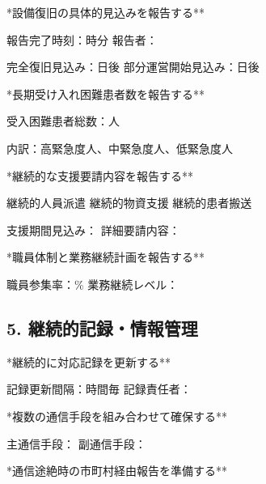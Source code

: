 \documentclass[
  japanese,
  letterpaper,
  DIV=11,
  numbers=noendperiod]{scrartcl}
\begin{document}
\checkbox **設備復旧の具体的見込みを報告する**

\quad 報告完了時刻：\underlinespace{1cm}時\underlinespace{1cm}分
\quad 報告者：\underlinespace{4cm}

\quad 完全復旧見込み：\underlinespace{2cm}日後
\quad 部分運営開始見込み：\underlinespace{2cm}日後

\vspace{3mm}

\checkbox **長期受け入れ困難患者数を報告する**

\quad 受入困難患者総数：\underlinespace{2cm}人

\quad 内訳：高緊急度\underlinespace{2cm}人、中緊急度\underlinespace{2cm}人、低緊急度\underlinespace{2cm}人

\vspace{3mm}

\checkbox **継続的な支援要請内容を報告する**

\checkbox 継続的人員派遣 \quad \checkbox 継続的物資支援
\quad \checkbox 継続的患者搬送

\quad 支援期間見込み：\underlinespace{4cm}
\quad 詳細要請内容：\underlinespace{8cm}

\vspace{3mm}

\checkbox **職員体制と業務継続計画を報告する**

\quad 職員参集率：\underlinespace{2cm}\%
\quad 業務継続レベル：\underlinespace{6cm}

\vspace{5mm}

\subsection{5.
継続的記録・情報管理}\label{ux7d99ux7d9aux7684ux8a18ux9332ux60c5ux5831ux7ba1ux7406}

\checkbox **継続的に対応記録を更新する**

\quad 記録更新間隔：\underlinespace{2cm}時間毎
\quad 記録責任者：\underlinespace{4cm}

\vspace{3mm}

\checkbox **複数の通信手段を組み合わせて確保する**

\quad 主通信手段：\underlinespace{6cm}
\quad 副通信手段：\underlinespace{6cm}

\vspace{3mm}

\checkbox **通信途絶時の市町村経由報告を準備する**
\end{document}
